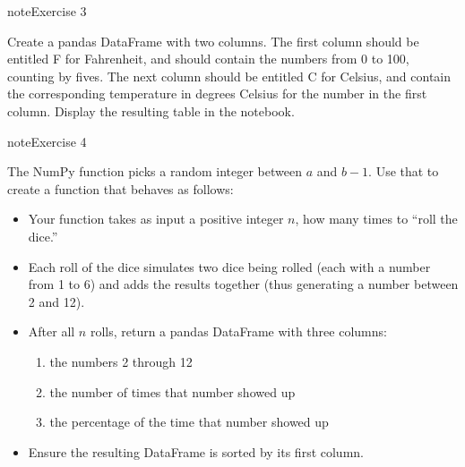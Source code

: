 \documentclass[letterpaper,10pt,english]{sphinxmanual}
\begin{document}
\begin{sphinxadmonition}{note}{Exercise 3}

Create a pandas DataFrame with two columns.  The first column should be entitled F for Fahrenheit, and should contain the numbers from 0 to 100, counting by fives.  The next column should be entitled C for Celsius, and contain the corresponding temperature in degrees Celsius for the number in the first column.  Display the resulting table in the notebook.
\end{sphinxadmonition}

\begin{sphinxadmonition}{note}{Exercise 4}

The NumPy function  picks a random integer between \(a\) and \(b-1\).  Use that to create a function that behaves as follows:
\begin{itemize}
\item {} 
Your function takes as input a positive integer \(n\), how many times to “roll the dice.”

\item {} 
Each roll of the dice simulates two dice being rolled (each with a number from 1 to 6) and adds the results together (thus generating a number between 2 and 12).

\item {} 
After all \(n\) rolls, return a pandas DataFrame with three columns:
\begin{enumerate}
%
\item {} 
the numbers 2 through 12

\item {} 
the number of times that number showed up

\item {} 
the percentage of the time that number showed up

\end{enumerate}

\item {} 
Ensure the resulting DataFrame is sorted by its first column.

\end{itemize}
\end{sphinxadmonition}
\end{document}
